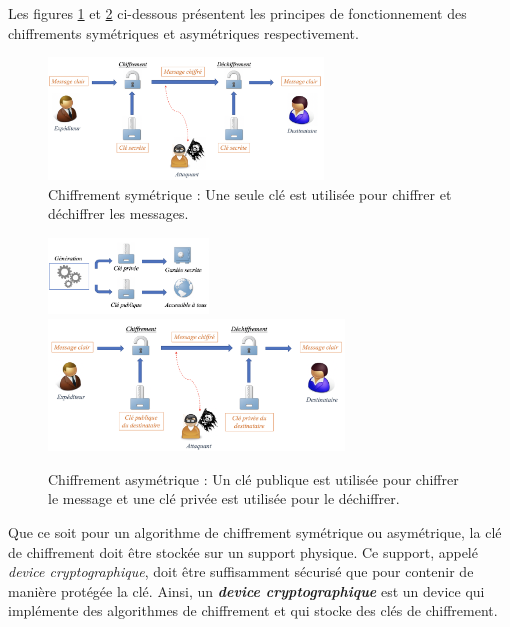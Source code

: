 \documentclass[10pt, oneside, a4paper]{article}
\begin{document}
Les figures \ref{fig:symétrique} et \ref{fig:asymétrique} ci-dessous présentent les principes de fonctionnement des chiffrements symétriques et asymétriques respectivement.

\begin{figure}[htbp]
    \centering
    \includegraphics[width=0.65\textwidth]{image/symetrique}
    \caption{Chiffrement symétrique : Une seule clé est utilisée pour chiffrer et déchiffrer les messages.}
    \label{fig:symétrique}
\end{figure}

\begin{figure}[htbp]
    \centering
    \includegraphics[width=0.38\textwidth]{image/cle_asymetrique}
    \includegraphics[width=0.7\textwidth]{image/asymetrique}
    \caption{Chiffrement asymétrique : Un clé publique est utilisée pour chiffrer le message et une clé privée est utilisée pour le déchiffrer.}
    \label{fig:asymétrique}
\end{figure}


Que ce soit pour un algorithme de chiffrement symétrique ou asymétrique, la clé de chiffrement doit être stockée sur un support physique. Ce support, appelé \textit{device cryptographique}, doit être suffisamment sécurisé que pour contenir de manière protégée la clé. Ainsi, un \textbf{\textit{device cryptographique}} est un device qui implémente des algorithmes de chiffrement et qui stocke des clés de chiffrement.
\end{document}
